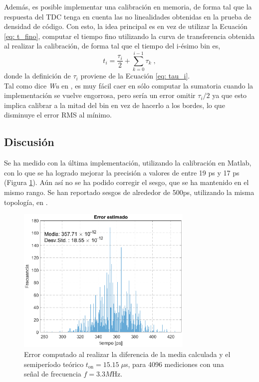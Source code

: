 Además, es posible implementar una calibración en memoria, de forma tal que la respuesta del TDC
tenga en cuenta las no linealidades obtenidas en la prueba de densidad de código. Con esto, la idea principal es
en vez de utilizar la Ecuación \ref{eq: t_fino}, computar el tiempo fino utilizando la curva de transferencia obtenida
al realizar la calibración, de forma tal que el tiempo del i-ésimo bin es,
\begin{equation*}
     t_i = \dfrac{\tau_i}{2} + \sum_{k=0}^{i-1} \tau_k \; ,
\end{equation*}
donde la definición de $\tau_i$ proviene de la Ecuación \ref{eq: tau_i}. \\
Tal como dice \textit{Wu} en \cite{Wu2010}, es muy fácil caer en sólo computar la sumatoria cuando
la implementación se vuelve engorrosa, pero sería un error omitir $\tau_i/2$ ya que esto implica calibrar
a la mitad del bin en vez de hacerlo a los bordes, lo que disminuye el error RMS al mínimo.

\subsection{Discusión}
Se ha medido con la última implementación, utilizando la calibración en Matlab, con lo que se ha logrado mejorar
la precisión a valores de entre 19 ps y 17 ps (Figura \ref{fig: medicion_final}). Aún así no se ha podido 
corregir el sesgo, que se ha mantenido en el mismo rango. Se han reportado sesgos de alrededor de 500ps,
utilizando la misma topología, en \cite{machado_readout_2020}. \\

\begin{figure}[H]
      \centering
      \includegraphics[width=0.75\textwidth]{imagenes/Medicion_final.eps}
      \caption{Error computado al realizar la diferencia de la media calculada y el semiperíodo 
      teórico $t_\text{on} = 15.15\;\mu$s, para 4096 mediciones con una señal de frecuencia $f=3.3M$Hz.}
      \label{fig: medicion_final}
\end{figure}


